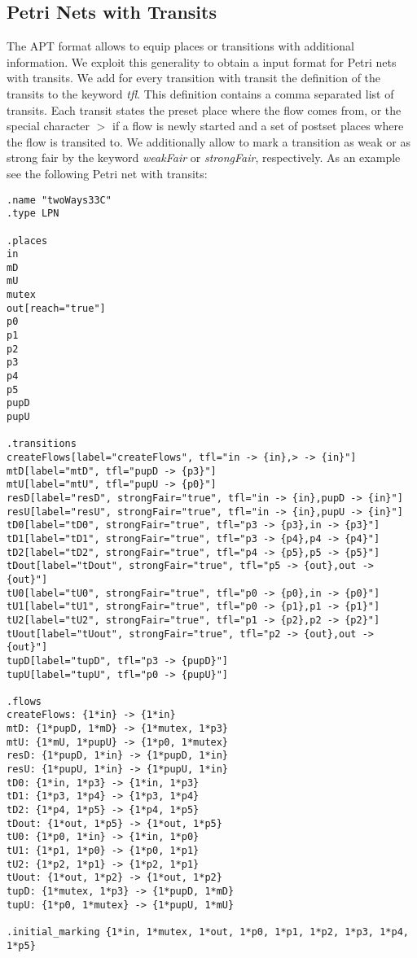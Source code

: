 \documentclass[12pt,twoside,a4paper,openright]{memoir}
\begin{document}
\subsection{Petri Nets with Transits}
\label{sec:format_pnwt}
The APT format allows to equip places or transitions with additional information.
We exploit this generality to obtain a input format for Petri nets with transits.
We add for every transition with transit the definition of the transits to the keyword \emph{tfl}.
This definition contains a comma separated list of transits.
Each transit states the preset place where the flow comes from, or the special character \(>\) if a flow is newly
started and a set of postset places where the flow is transited to.
We additionally allow to mark a transition as weak or as strong fair by the keyword \emph{weakFair} or \emph{strongFair}, respectively.
As an example see the following Petri net with transits:
\begin{lstlisting}[captionpos=b, caption=An example Petri net with transits in \tool{}'s format., label = lst:grammar,language=apt-format]
.name "twoWays33C"
.type LPN

.places
in
mD
mU
mutex
out[reach="true"]
p0
p1
p2
p3
p4
p5
pupD
pupU

.transitions
createFlows[label="createFlows", tfl="in -> {in},> -> {in}"]
mtD[label="mtD", tfl="pupD -> {p3}"]
mtU[label="mtU", tfl="pupU -> {p0}"]
resD[label="resD", strongFair="true", tfl="in -> {in},pupD -> {in}"]
resU[label="resU", strongFair="true", tfl="in -> {in},pupU -> {in}"]
tD0[label="tD0", strongFair="true", tfl="p3 -> {p3},in -> {p3}"]
tD1[label="tD1", strongFair="true", tfl="p3 -> {p4},p4 -> {p4}"]
tD2[label="tD2", strongFair="true", tfl="p4 -> {p5},p5 -> {p5}"]
tDout[label="tDout", strongFair="true", tfl="p5 -> {out},out -> {out}"]
tU0[label="tU0", strongFair="true", tfl="p0 -> {p0},in -> {p0}"]
tU1[label="tU1", strongFair="true", tfl="p0 -> {p1},p1 -> {p1}"]
tU2[label="tU2", strongFair="true", tfl="p1 -> {p2},p2 -> {p2}"]
tUout[label="tUout", strongFair="true", tfl="p2 -> {out},out -> {out}"]
tupD[label="tupD", tfl="p3 -> {pupD}"]
tupU[label="tupU", tfl="p0 -> {pupU}"]

.flows
createFlows: {1*in} -> {1*in}
mtD: {1*pupD, 1*mD} -> {1*mutex, 1*p3}
mtU: {1*mU, 1*pupU} -> {1*p0, 1*mutex}
resD: {1*pupD, 1*in} -> {1*pupD, 1*in}
resU: {1*pupU, 1*in} -> {1*pupU, 1*in}
tD0: {1*in, 1*p3} -> {1*in, 1*p3}
tD1: {1*p3, 1*p4} -> {1*p3, 1*p4}
tD2: {1*p4, 1*p5} -> {1*p4, 1*p5}
tDout: {1*out, 1*p5} -> {1*out, 1*p5}
tU0: {1*p0, 1*in} -> {1*in, 1*p0}
tU1: {1*p1, 1*p0} -> {1*p0, 1*p1}
tU2: {1*p2, 1*p1} -> {1*p2, 1*p1}
tUout: {1*out, 1*p2} -> {1*out, 1*p2}
tupD: {1*mutex, 1*p3} -> {1*pupD, 1*mD}
tupU: {1*p0, 1*mutex} -> {1*pupU, 1*mU}

.initial_marking {1*in, 1*mutex, 1*out, 1*p0, 1*p1, 1*p2, 1*p3, 1*p4, 1*p5}
\end{lstlisting}
\end{document}
